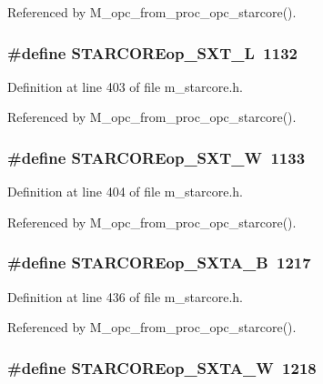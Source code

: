 Referenced by M\_\-opc\_\-from\_\-proc\_\-opc\_\-starcore().
\subsubsection{\setlength{\rightskip}{0pt plus 5cm}\#define STARCOREop\_\-SXT\_\-L~1132}\label{m__starcore_8h_bb2c49cc786d42796db1c07e35e48b7c}




Definition at line 403 of file m\_\-starcore.h.

Referenced by M\_\-opc\_\-from\_\-proc\_\-opc\_\-starcore().
\subsubsection{\setlength{\rightskip}{0pt plus 5cm}\#define STARCOREop\_\-SXT\_\-W~1133}\label{m__starcore_8h_d8a6203cd7cd2b7143043a892aadcc96}




Definition at line 404 of file m\_\-starcore.h.

Referenced by M\_\-opc\_\-from\_\-proc\_\-opc\_\-starcore().
\subsubsection{\setlength{\rightskip}{0pt plus 5cm}\#define STARCOREop\_\-SXTA\_\-B~1217}\label{m__starcore_8h_dc2c483f861da7b831bbaa1366afa519}




Definition at line 436 of file m\_\-starcore.h.

Referenced by M\_\-opc\_\-from\_\-proc\_\-opc\_\-starcore().
\subsubsection{\setlength{\rightskip}{0pt plus 5cm}\#define STARCOREop\_\-SXTA\_\-W~1218}\label{m__starcore_8h_2be5e8ea8f8c05bb100481f92d6534f0}




